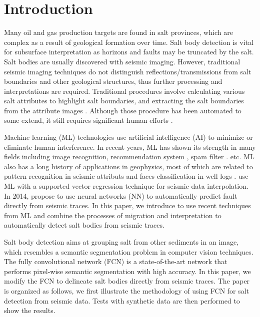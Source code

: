 \documentclass{cph18}
\begin{document}
\section{Introduction}

Many oil and gas production targets are found in salt provinces, which are complex as a result of geological formation over time. Salt body detection is vital for subsurface interpretation as horizons and faults may be truncated by the salt. 
Salt bodies are usually discovered with seismic imaging. However, 
traditional seismic imaging techniques do not distinguish reflections/transmissions from salt boundaries and other geological structures, thus further processing and interpretations are required. Traditional procedures involve calculating various salt attributes \citep{jing07,berthelot13,wang15, halpert14} to highlight salt boundaries, and extracting the salt boundaries from the attribute images \citep{lomask07, ramirez16}. Although those procedure has been automated to some extend, it still requires significant human efforts \citep{wu16}. 

Machine learning (ML) technologies use artificial intelligence (AI) to minimize or eliminate human interference. In recent years, ML has shown its strength in many fields including image recognition, recommendation system \citep{Bobadilla13}, spam filter \citep{Androutsopoulos00}. 
etc. ML also has a long history of applications in geophysics, most of which are related to pattern recognition in seismic attributs  \citep{zeng04,zhao15} and faces classification in well logs \citep{lim05,hall16}. \citet{jia17} use ML with a supported vector regression technique for seismic data interpolation. In 2014, \citet{zhang14} propose to use neural networks (NN) to automatically predict fault directly from seismic traces. In this paper, we introduce to use recent techniques from ML and combine the processes of migration and interpretation to automatically detect salt bodies from seismic traces. 

Salt body detection aims at grouping salt from other sediments in an image, which resembles a semantic segmentation problem in computer vision techniques. 
The fully convolutional network (FCN) \citep{long15} is a state-of-the-art network that performs pixel-wise semantic segmentation with high accuracy. In this paper, we modify the FCN to delineate salt bodies directly from seismic traces. The paper is organized as follows, we first illustrate the methodology of using FCN for salt detection from seismic data. Tests with synthetic data are then performed to show the results. 
\end{document}
